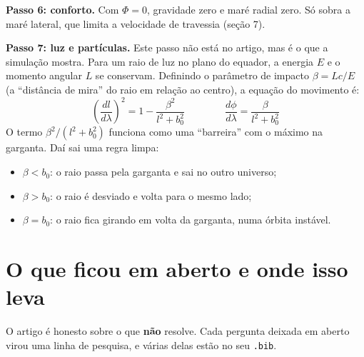 \documentclass[11pt,a4paper]{article}
\begin{document}
\textbf{Passo 6: conforto.} Com $\Phi = 0$, gravidade zero e maré radial zero. Só sobra a maré lateral, que limita a
velocidade de travessia (seção 7).

\textbf{Passo 7: luz e partículas.} Este passo não está no artigo, mas é o que a simulação mostra. Para um raio de luz
no plano do equador, a energia $E$ e o momento angular $L$ se conservam. Definindo o parâmetro de impacto
$\beta = Lc/E$ (a ``distância de mira'' do raio em relação ao centro), a equação do movimento é:
\begin{equation}
\left(\frac{dl}{d\lambda}\right)^2 = 1 - \frac{\beta^2}{l^2 + b_0^2} \qquad\qquad
\frac{d\phi}{d\lambda} = \frac{\beta}{l^2 + b_0^2}
\end{equation}
O termo $\beta^2/(l^2 + b_0^2)$ funciona como uma ``barreira'' com o máximo na garganta. Daí sai uma regra limpa:
\begin{itemize}[nosep]
\item $\beta < b_0$: o raio passa pela garganta e sai no outro universo;
\item $\beta > b_0$: o raio é desviado e volta para o mesmo lado;
\item $\beta = b_0$: o raio fica girando em volta da garganta, numa órbita instável.
\end{itemize}

\section{O que ficou em aberto e onde isso leva}

O artigo é honesto sobre o que \textbf{não} resolve. Cada pergunta deixada em aberto virou uma linha de pesquisa, e
várias delas estão no seu \texttt{.bib}.
\end{document}
